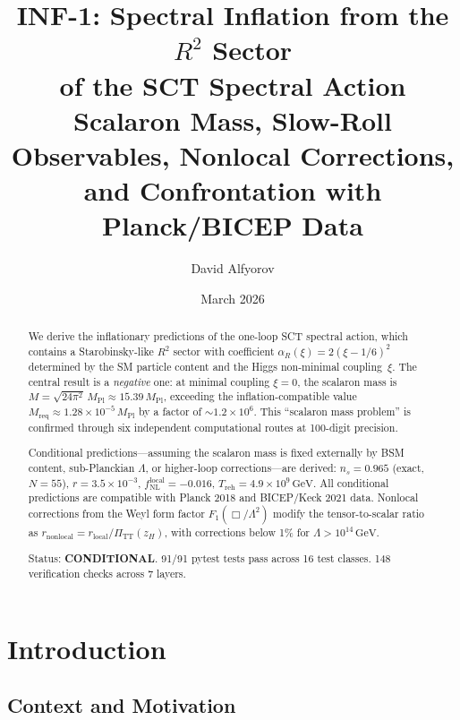 \documentclass[11pt,a4paper]{article}
\title{INF-1: Spectral Inflation from the $R^2$ Sector\\
of the SCT Spectral Action\\[6pt]
\large Scalaron Mass, Slow-Roll Observables, Nonlocal Corrections,\\
and Confrontation with Planck/BICEP Data}
\author{David Alfyorov}
\date{March 2026}
\theoremstyle{plain}
\theoremstyle{definition}
\begin{document}
\maketitle

\begin{center}
\end{center}

\begin{abstract}
We derive the inflationary predictions of the one-loop SCT spectral
action, which contains a Starobinsky-like $R^2$ sector with coefficient
$\alpha_R(\xi) = 2(\xi - 1/6)^2$ determined by the SM particle content
and the Higgs non-minimal coupling~$\xi$.  The central result is a
\emph{negative} one: at minimal coupling $\xi = 0$, the scalaron mass
is $M = \sqrt{24\pi^2}\,M_{\mathrm{Pl}} \approx 15.39\,M_{\mathrm{Pl}}$,
exceeding the inflation-compatible value
$M_{\mathrm{req}} \approx 1.28 \times 10^{-5}\,M_{\mathrm{Pl}}$ by a
factor of $\sim 1.2 \times 10^6$.  This ``scalaron mass problem'' is
confirmed through six independent computational routes at 100-digit precision.

Conditional predictions---assuming the scalaron mass is fixed externally
by BSM content, sub-Planckian $\Lambda$, or higher-loop corrections---are
derived: $n_s = 0.965$ (exact, $N = 55$), $r = 3.5 \times 10^{-3}$,
$f_{\mathrm{NL}}^{\mathrm{local}} = -0.016$,
$T_{\mathrm{reh}} = 4.9 \times 10^9\,\mathrm{GeV}$.  All conditional
predictions are compatible with Planck 2018 and BICEP/Keck 2021 data.
Nonlocal corrections from the Weyl form factor $F_1(\Box/\Lambda^2)$
modify the tensor-to-scalar ratio as
$r_{\mathrm{nonlocal}} = r_{\mathrm{local}} / \Pi_{\mathrm{TT}}(z_H)$,
with corrections below 1\% for $\Lambda > 10^{14}\,\mathrm{GeV}$.

Status: \textbf{CONDITIONAL}.  91/91 pytest tests pass across 16 test
classes.  148 verification checks across 7 layers.
\end{abstract}

\tableofcontents

\section{Introduction}\label{sec:intro}

\subsection{Context and Motivation}
\end{document}
